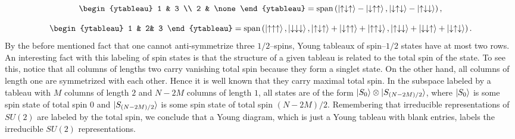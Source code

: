 \begin{equation}
\begin{ytableau}
1 & 3 \\
2 &  \none 
\end{ytableau}=\Span{\ket{\uparrow \downarrow \uparrow }-\ket{\downarrow \uparrow \uparrow},\ket{\downarrow \uparrow \downarrow }-\ket{\uparrow \downarrow \downarrow}},
\end{equation}


\begin{equation}
\begin{ytableau}
1 & 2& 3 
\end{ytableau}=\Span{\ket{\uparrow \uparrow \uparrow },\ket{\downarrow\downarrow\downarrow},\ket{\uparrow\downarrow\uparrow}+\ket{\downarrow\uparrow\uparrow}+\ket{\uparrow\uparrow\downarrow},\ket{\uparrow\downarrow\downarrow}+\ket{\downarrow\downarrow\uparrow}+\ket{\downarrow\uparrow\downarrow}}.
\end{equation}
By the before mentioned fact that one cannot anti-symmetrize three $ 1/2 $--spins, Young tableaux of spin--$1/2$ states have at most two rows. An interesting fact with this labeling of spin states is that the structure of a given tableau is related to the total spin of the state. To see this, notice that all columns of lengths two carry vanishing total spin because they form a singlet state. On the other hand, all columns of length one are symmetrized with each other. Hence it is well known that they carry maximal total spin. In the subspace labeled by a tableau with $ M $ columns of length $ 2 $ and $ N-2M $ columns of length $ 1 $, all states are of the form $ \ket{S_0}\otimes \ket{S_{(N-2M)/2}} $, where $ \ket{S_0} $ is some spin state of total spin $ 0 $ and $ \ket{S_{(N-2M)/2}} $ is some spin state of total spin $ (N-2M)/2 $. Remembering that irreducible representations of $ SU(2) $ are labeled by the total spin, we conclude that a Young diagram, which is just a Young tableau with blank entries, labels the irreducible $ SU(2) $ representations.\\
